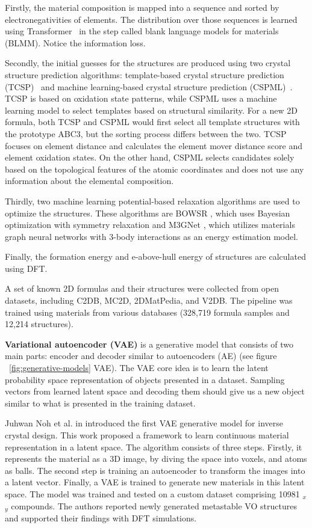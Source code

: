 Firstly, the material composition is mapped into a sequence and sorted by electronegativities of elements. The distribution over those sequences is learned using Transformer~\cite{vaswani2017attention} in the step called blank language models for materials (BLMM). Notice the information loss.

Secondly, the initial guesses for the structures are produced using two crystal structure prediction algorithms: template-based crystal structure prediction (TCSP)~\cite{wei2022tcsp} and machine learning-based crystal structure prediction (CSPML)~\cite{kusaba2022crystal}. TCSP is based on oxidation state patterns, while CSPML uses a machine learning model to select templates based on structural similarity. For a new 2D formula, both TCSP and CSPML would first select all template structures with the prototype ABC3, but the sorting process differs between the two. TCSP focuses on element distance and calculates the element mover distance score and element oxidation states. On the other hand, CSPML selects candidates solely based on the topological features of the atomic coordinates and does not use any information about the elemental composition.

Thirdly, two machine learning potential-based relaxation algorithms are used to optimize the structures. These algorithms are BOWSR \cite{zuo2021accelerating}, which uses Bayesian optimization with symmetry relaxation and M3GNet \cite{chen2022universal}, which utilizes materials graph neural networks with 3-body interactions as an energy estimation model. 

Finally, the formation energy and e-above-hull energy of structures are calculated using DFT.

A set of known 2D formulas and their structures were collected from open datasets, including C2DB, MC2D, 2DMatPedia, and V2DB. The pipeline was trained using materials from various databases (328,719 formula samples and 12,214 structures).

\textbf{Variational autoencoder (VAE)} is a generative model that consists of two main parts:  encoder and decoder \cite{kingma2013auto} similar to autoencoders (AE) (see figure ~\ref{fig:generative-models} VAE). The VAE core idea is to learn the latent probability space representation of objects presented in a dataset. Sampling vectors from learned latent space and decoding them should give us a new object similar to what is presented in the training dataset.

Juhwan Noh et al. in \cite{noh2019inverse} introduced the first VAE generative model for inverse crystal design. This work proposed a framework to learn continuous material representation in a latent space. The algorithm consists of three steps. Firstly, it represents the material as a 3D image, by diving the space into voxels, and atoms as balls. The second step is training an autoencoder to transform the images into a latent vector. Finally, a VAE is trained to generate new materials in this latent space. The model was trained and tested on a custom  dataset comprising 10981 $_x$$_y$ compounds. The authors reported newly generated metastable VO structures and supported their findings with DFT simulations.

